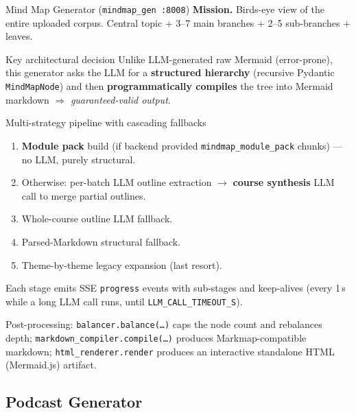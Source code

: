 \documentclass[aspectratio=169, 10pt]{beamer}
\begin{document}
\begin{frame}{Mind Map Generator (\texttt{mindmap\_gen :8008})}
  \scriptsize
  \textbf{Mission.} Birds-eye view of the entire uploaded corpus.
  Central topic + 3--7 main branches + 2--5 sub-branches + leaves.

  \begin{block}{Key architectural decision}
    Unlike LLM-generated raw Mermaid (error-prone), this generator asks the
    LLM for a \textbf{structured hierarchy} (recursive Pydantic
    \texttt{MindMapNode}) and then \textbf{programmatically compiles} the
    tree into Mermaid markdown $\Rightarrow$ \textit{guaranteed-valid
    output}.
  \end{block}

  \begin{exampleblock}{Multi-strategy pipeline with cascading fallbacks}
    \scriptsize
    \begin{enumerate}
      \setlength\itemsep{0pt}
      \item \textbf{Module pack} build (if backend provided
            \texttt{mindmap\_module\_pack} chunks) --- no LLM, purely
            structural.
      \item Otherwise: per-batch LLM outline extraction $\to$
            \textbf{course synthesis} LLM call to merge partial outlines.
      \item Whole-course outline LLM fallback.
      \item Parsed-Markdown structural fallback.
      \item Theme-by-theme legacy expansion (last resort).
    \end{enumerate}
    Each stage emits SSE \texttt{progress} events with sub-stages and
    keep-alives (every 1\,s while a long LLM call runs, until
    \texttt{LLM\_CALL\_TIMEOUT\_S}).
  \end{exampleblock}

  \scriptsize
  Post-processing: \texttt{balancer.balance(\dots)} caps the node count
  and rebalances depth; \texttt{markdown\_compiler.compile(\dots)}
  produces Markmap-compatible markdown; \texttt{html\_renderer.render}
  produces an interactive standalone HTML (Mermaid.js) artifact.
\end{frame}

\subsection*{Podcast Generator}
\end{document}

